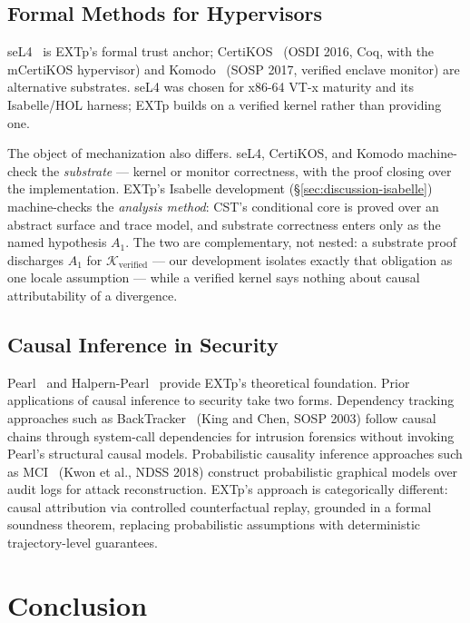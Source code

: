 \documentclass[conference]{IEEEtran}
\newcommand{\Kverified}{\mathcal{K}_\text{verified}}
\begin{document}
\subsection{Formal Methods for Hypervisors}

seL4~\cite{klein2009sel4,klein2014sel4} is EXTp's formal trust
anchor; CertiKOS~\cite{gu2016certikos} (OSDI 2016, Coq, with the
mCertiKOS hypervisor) and Komodo~\cite{ferraiuolo2017komodo} (SOSP
2017, verified enclave monitor) are alternative substrates. seL4 was
chosen for x86-64 VT-x maturity and its Isabelle/HOL harness; EXTp
builds on a verified kernel rather than providing one.

The object of mechanization also differs. seL4, CertiKOS, and Komodo
machine-check the \emph{substrate} --- kernel or monitor correctness,
with the proof closing over the implementation. EXTp's Isabelle
development (\S\ref{sec:discussion-isabelle}) machine-checks the
\emph{analysis method}: CST's conditional core is proved over an
abstract surface and trace model, and substrate correctness enters
only as the named hypothesis $A_1$. The two are complementary, not
nested: a substrate proof discharges $A_1$ for $\Kverified$ ---
our development isolates exactly that obligation as one locale
assumption --- while a verified kernel says nothing about causal
attributability of a divergence.

\subsection{Causal Inference in Security}

Pearl~\cite{pearl2009causality} and
Halpern-Pearl~\cite{halpern2005causes} provide EXTp's theoretical
foundation. Prior applications of causal inference to security
take two forms.
Dependency tracking approaches such as
BackTracker~\cite{king2003backtracking} (King and Chen, SOSP 2003)
follow causal chains through system-call dependencies for intrusion
forensics without invoking Pearl's structural causal models.
Probabilistic causality inference approaches such as
MCI~\cite{kwon2018mci} (Kwon et al., NDSS 2018) construct
probabilistic graphical models over audit logs for attack
reconstruction. EXTp's approach is categorically different: causal
attribution via controlled counterfactual replay, grounded in a
formal soundness theorem, replacing probabilistic assumptions with
deterministic trajectory-level guarantees.

\section{Conclusion}\label{sec:conclusion}
\end{document}
